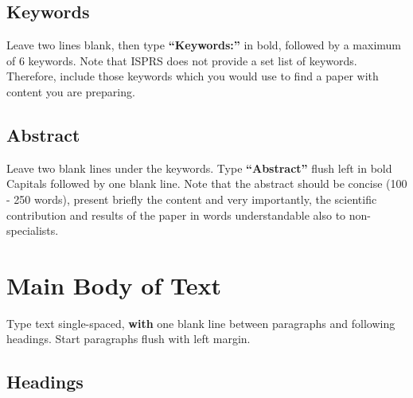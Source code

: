 \documentclass{isprs} %
\begin{document}



\subsection{Keywords}\label{sec:Keywords}

Leave two lines blank, then type \textbf{``Keywords:''} in bold, followed by a maximum of 6 keywords. Note that ISPRS does not provide a set list of keywords. Therefore, include those keywords which you would use to find a paper with content you are preparing.


\subsection{Abstract}\label{sec:Abstract}

Leave two blank lines under the keywords. Type \textbf{``Abstract''}
flush left in bold Capitals followed by one blank line. Note that the abstract should be concise (100 - 250 words), present briefly the content and very importantly, the scientific contribution and results of the paper in words understandable also to non-specialists.


\section{Main Body of Text}\label{sec:MAIN BODY OF TEXT}

Type text single-spaced, \textbf{with} one blank line between paragraphs and 
following headings. Start paragraphs flush with left margin.


\subsection{Headings}\label{sec:Headings}
\end{document}

